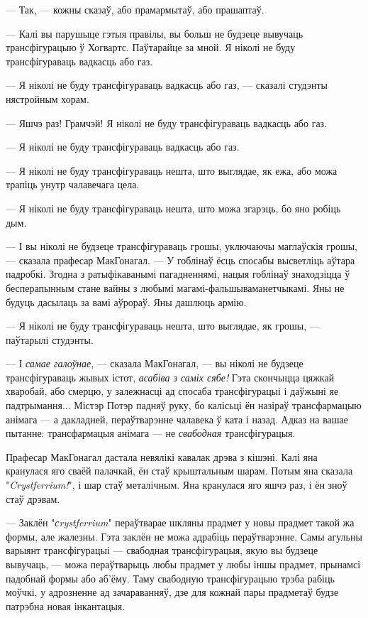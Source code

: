 --- Так, --- кожны сказаў, або прамармытаў, або прашаптаў.

--- Калі вы парушыце гэтыя правілы, вы больш не будзеце вывучаць 
трансфігурацыю ў Хогвартс. Паўтарайце за мной. Я ніколі не буду трансфігураваць
вадкасць або газ.

--- Я ніколі не буду трансфігураваць
вадкасць або газ, --- сказалі студэнты нястройным хорам.

--- Яшчэ раз! Грамчэй! Я ніколі не буду трансфігураваць
вадкасць або газ.

--- Я ніколі не буду трансфігураваць
вадкасць або газ.

--- Я ніколі не буду трансфігураваць
нешта, што выглядае, як ежа, або можа трапіць унутр чалавечага цела.

--- Я ніколі не буду трансфігураваць
нешта, што можа згарэць, бо яно робіць дым.

--- І вы ніколі не будзеце трансфігураваць грошы, уключаючы маглаўскія грошы, --- сказала
прафесар МакГонагал. --- У гоблінаў ёсць спосабы высветліць аўтара падробкі.
Згодна з ратыфікаванымі пагадненнямі, нацыя гоблінаў знаходзіцца 
ў бесперапынным стане вайны з любымі магамі-фальшываманетчыкамі. Яны не будуць 
дасылаць за вамі аўрораў. Яны дашлюць армію.

--- Я ніколі не буду трансфігураваць
нешта, што выглядае, як грошы, --- паўтарылі студэнты.

--- І \emph{самае галоўнае}, --- сказала МакГонагал, --- вы ніколі не будзеце
трансфігураваць жывых істот, \emph{асабіва з саміх сябе!} Гэта скончыцца цяжкай хваробай,
або смерцю, у залежнасці ад спосаба трансфігурацыі і даўжыні яе падтрымання...
Містэр Потэр падняў руку, бо калісьці ён назіраў трансфармацыю анімага --- а
дакладней, пераўтварэнне чалавека ў ката і назад. Адказ на вашае пытанне: 
трансфармацыя анімага --- не \emph{свабодная} трансфігурацыя.

Прафесар МакГонагал дастала невялікі кавалак дрэва з кішэні. Калі яна кранулася 
яго сваёй палачкай, ён стаў крыштальным шарам. Потым яна сказала "\emph{Crystferrium!}",
і шар стаў металічным. Яна кранулася яго яшчэ раз, і ён зноў стаў дрэвам.

--- Заклён "\emph{сrystferrium}" пераўтварае шкляны прадмет у новы прадмет такой жа 
формы, але жалезны. Гэта заклён не можа адрабіць пераўтварэнне. 
Самы агульны варыянт трансфігурацыі --- свабодная трансфігурацыя, якую вы будзеце
вывучаць, --- можа пераўтварыць любы прадмет у любы іншы прадмет, прынамсі 
падобнай формы або аб'ёму. Таму свабодную трансфігурацыю трэба рабіць моўчкі, у адрозненне
ад зачараванняў, дзе для кожнай пары прадметаў будзе патрэбна новая інкантацыя.

